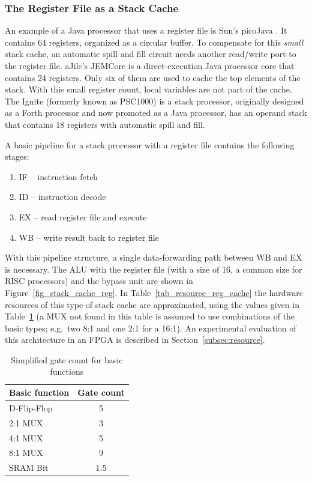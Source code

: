 \subsubsection{The Register File as a Stack Cache}

An example of a Java processor that uses a register file is Sun's
picoJava \cite{pjMicroArch}. It contains 64 registers, organized as
a circular buffer. To compensate for this \emph{small} stack cache,
an automatic spill and fill circuit needs another read/write port to
the register file. aJile's JEMCore \cite{880720} is a
direct-execution Java processor core that contains 24 registers.
Only six of them are used to cache the top elements of the stack.
With this small register count, local variables are not part of the
cache. The Ignite \cite{IGNITE} (formerly known as PSC1000) is a
stack processor, originally designed as a Forth processor and now
promoted as a Java processor, has an operand stack that contains 18
registers with automatic spill and fill.

A basic pipeline for a stack processor with a register file contains the
following stages:
%
\begin{enumerate}
\item IF -- instruction fetch
\item ID -- instruction decode
\item EX -- read register file and execute
\item WB -- write result back to register file
\end{enumerate}
%
With this pipeline structure, a single data-forwarding path between
WB and EX is necessary. The ALU with the register file (with a size
of 16, a common size for RISC processors) and the bypass unit are
shown in Figure~\ref{fig_stack_cache_reg}. In
Table~\ref{tab_resource_reg_cache} the hardware resources of this
type of stack cache are approximated, using the values given in
Table~\ref{tab_simp_gate_count} (a MUX not found in this table is
assumed to use combinations of the basic types; e.g.\ two 8:1 and
one 2:1 for a 16:1). An experimental evaluation of this architecture
in an FPGA is described in Section~\ref{subsec:resource}.

\begin{table}[hbtp]
    \centering
    \begin{tabular}{lc}
        \toprule
        Basic function & Gate count \\
        \midrule
        D-Flip-Flop&5 \\
        2:1 MUX&3 \\
        4:1 MUX&5 \\
        8:1 MUX&9 \\
        SRAM Bit&1.5 \\
        \bottomrule
    \end{tabular}
    \caption{Simplified gate count for basic functions}
    \label{tab_simp_gate_count}
\end{table}

